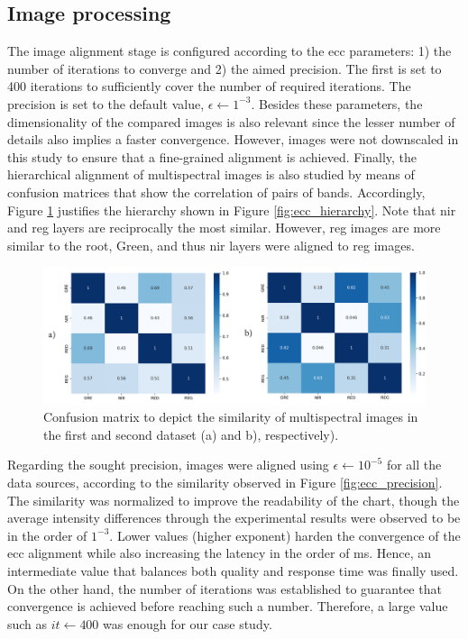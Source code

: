 \subsection{Image processing}

The image alignment stage is configured according to the \acrshort{ecc} parameters: 1) the number of iterations to converge and 2) the aimed precision. The first is set to 400 iterations to sufficiently cover the number of required iterations. The precision is set to the default value, $\epsilon \gets 1^{-3}$. Besides these parameters, the dimensionality of the compared images is also relevant since the lesser number of details also implies a faster convergence. However, images were not downscaled in this study to ensure that a fine-grained alignment is achieved. Finally, the hierarchical alignment of multispectral images is also studied by means of confusion matrices that show the correlation of pairs of bands. Accordingly, Figure \ref{fig:occlusion_confusion_matrices} justifies the hierarchy shown in Figure \ref{fig:ecc_hierarchy}. Note that \acrshort{nir} and \acrshort{reg} layers are reciprocally the most similar. However, \acrshort{reg} images are more similar to the root, Green, and thus \acrshort{nir} layers were aligned to \acrshort{reg} images.

\begin{figure}[ht]
    \centering
    \includegraphics[width=\linewidth]{figs/multi_thermal_projection/results/confusion_matrices.png}
    \caption{Confusion matrix to depict the similarity of multispectral images in the first and second dataset (a) and b), respectively).}
    \label{fig:occlusion_confusion_matrices}
\end{figure}

Regarding the sought precision, images were aligned using $\epsilon \gets 10^{-5}$ for all the data sources, according to the similarity observed in Figure \ref{fig:ecc_precision}. The similarity was normalized to improve the readability of the chart, though the average intensity differences through the experimental results were observed to be in the order of $1^{-3}$. Lower values (higher exponent) harden the convergence of the \acrshort{ecc} alignment while also increasing the latency in the order of \si{\milli\second}. Hence, an intermediate value that balances both quality and response time was finally used. On the other hand, the number of iterations was established to guarantee that convergence is achieved before reaching such a number. Therefore, a large value such as $\textit{it} \gets 400$ was enough for our case study.

